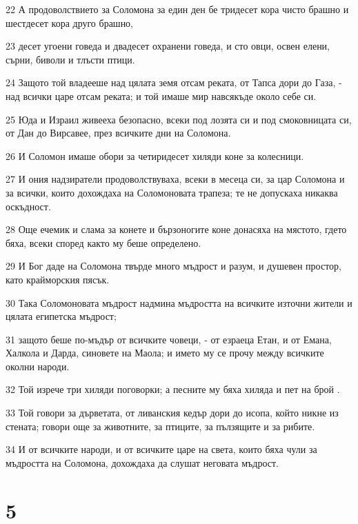 \par 22 А продоволствието за Соломона за един ден бе тридесет кора чисто брашно и шестдесет кора друго брашно,
\par 23 десет угоени говеда и двадесет охранени говеда, и сто овци, освен елени, сърни, биволи и тлъсти птици.
\par 24 Защото той владееше над цялата земя отсам реката, от Тапса дори до Газа, - над всички царе отсам реката; и той имаше мир навсякъде около себе си.
\par 25 Юда и Израил живееха безопасно, всеки под лозята си и под смоковницата си, от Дан до Вирсавее, през всичките дни на Соломона.
\par 26 И Соломон имаше обори за четиридесет хиляди коне за колесници.
\par 27 И ония надзиратели продоволствуваха, всеки в месеца си, за цар Соломона и за всички, които дохождаха на Соломоновата трапеза; те не допускаха никаква оскъдност.
\par 28 Още ечемик и слама за конете и бързоногите коне донасяха на мястото, гдето бяха, всеки според както му беше определено.
\par 29 И Бог даде на Соломона твърде много мъдрост и разум, и душевен простор, като крайморския пясък.
\par 30 Така Соломоновата мъдрост надмина мъдростта на всичките източни жители и цялата египетска мъдрост;
\par 31 защото беше по-мъдър от всичките човеци, - от езраеца Етан, и от Емана, Халкола и Дарда, синовете на Маола; и името му се прочу между всичките околни народи.
\par 32 Той изрече три хиляди поговорки; а песните му бяха хиляда и пет на брой .
\par 33 Той говори за дърветата, от ливанския кедър дори до исопа, който никне из стената; говори още за животните, за птиците, за пълзящите и за рибите.
\par 34 И от всичките народи, и от всичките царе на света, които бяха чули за мъдростта на Соломона, дохождаха да слушат неговата мъдрост.

\chapter{5}

